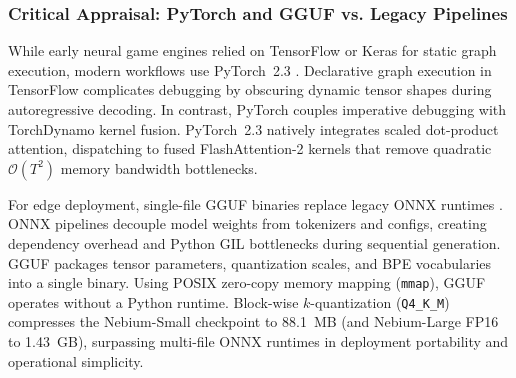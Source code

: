 \subsubsection{Critical Appraisal: PyTorch and GGUF vs. Legacy Pipelines}
\label{sec:tools_deployment}
While early neural game engines relied on TensorFlow or Keras for static graph execution, modern workflows use PyTorch~2.3 \parencite{paszke2019pytorch}. Declarative graph execution in TensorFlow complicates debugging by obscuring dynamic tensor shapes during autoregressive decoding. In contrast, PyTorch couples imperative debugging with TorchDynamo kernel fusion. PyTorch~2.3 natively integrates scaled dot-product attention, dispatching to fused FlashAttention-2 kernels that remove quadratic $\mathcal{O}(T^2)$ memory bandwidth bottlenecks.

For edge deployment, single-file GGUF binaries \parencite{gerganov2023llamacpp} replace legacy ONNX runtimes \parencite{bai2019onnx}. ONNX pipelines decouple model weights from tokenizers and configs, creating dependency overhead and Python GIL bottlenecks during sequential generation. GGUF packages tensor parameters, quantization scales, and BPE vocabularies into a single binary. Using POSIX zero-copy memory mapping (\texttt{mmap}), GGUF operates without a Python runtime. Block-wise $k$-quantization (\texttt{Q4\_K\_M}) compresses the Nebium-Small checkpoint to 88.1~MB (and Nebium-Large FP16 to 1.43~GB), surpassing multi-file ONNX runtimes in deployment portability and operational simplicity.
